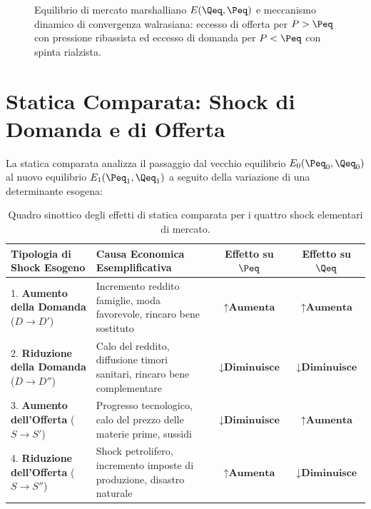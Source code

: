 \begin{figure}[htbp]
\caption{Equilibrio di mercato marshalliano $E(\Qeq, \Peq)$ e meccanismo dinamico di convergenza walrasiana: eccesso di offerta per $P > \Peq$ con pressione ribassista ed eccesso di domanda per $P < \Peq$ con spinta rialzista.}
\label{fig:equilibrio_mercato_dinamico}
\end{figure}

\section{Statica Comparata: Shock di Domanda e di Offerta}

La statica comparata analizza il passaggio dal vecchio equilibrio $E_0(\Peq_0, \Qeq_0)$ al nuovo equilibrio $E_1(\Peq_1, \Qeq_1)$ a seguito della variazione di una determinante esogena:

\begin{table}[htbp]
\centering
\small
\renewcommand{\arraystretch}{1.3}
\begin{tabularx}{\textwidth}{l X c c}
\toprule
\textbf{Tipologia di Shock Esogeno} & \textbf{Causa Economica Esemplificativa} & \textbf{Effetto su $\Peq$} & \textbf{Effetto su $\Qeq$} \\
\midrule
1. \textbf{Aumento della Domanda} ($D \to D'$) & Incremento reddito famiglie, moda favorevole, rincaro bene sostituto & $\mathbf{\uparrow \text{Aumenta}}$ & $\mathbf{\uparrow \text{Aumenta}}$ \\
2. \textbf{Riduzione della Domanda} ($D \to D''$) & Calo del reddito, diffusione timori sanitari, rincaro bene complementare & $\mathbf{\downarrow \text{Diminuisce}}$ & $\mathbf{\downarrow \text{Diminuisce}}$ \\
3. \textbf{Aumento dell'Offerta} ($S \to S'$) & Progresso tecnologico, calo del prezzo delle materie prime, sussidi & $\mathbf{\downarrow \text{Diminuisce}}$ & $\mathbf{\uparrow \text{Aumenta}}$ \\
4. \textbf{Riduzione dell'Offerta} ($S \to S''$) & Shock petrolifero, incremento imposte di produzione, disastro naturale & $\mathbf{\uparrow \text{Aumenta}}$ & $\mathbf{\downarrow \text{Diminuisce}}$ \\
\bottomrule
\end{tabularx}
\caption{Quadro sinottico degli effetti di statica comparata per i quattro shock elementari di mercato.}
\label{tab:statica_comparata}
\end{table}

